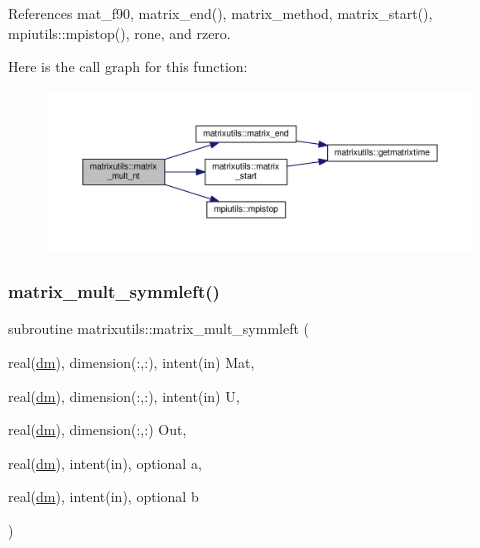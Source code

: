 References mat\+\_\+f90, matrix\+\_\+end(), matrix\+\_\+method, matrix\+\_\+start(), mpiutils\+::mpistop(), rone, and rzero.

Here is the call graph for this function\+:
\nopagebreak
\begin{figure}[H]
\begin{center}
\leavevmode
\includegraphics[width=350pt]{namespacematrixutils_a4a084a8c031469076ac26bf4e9055109_cgraph}
\end{center}
\end{figure}
\mbox{\label{namespacematrixutils_ab4f1087b56f3198b3d84c8ebf1cdd580}} 
\subsubsection{\texorpdfstring{matrix\+\_\+mult\+\_\+symmleft()}{matrix\_mult\_symmleft()}}
{\footnotesize\ttfamily subroutine matrixutils\+::matrix\+\_\+mult\+\_\+symmleft (\begin{DoxyParamCaption}\item[{real(\mbox{\hyperlink{namespacematrixutils_a7bdc564986ea4d90f51201c75606ef3d}{dm}}), dimension(\+:,\+:), intent(in)}]{Mat,  }\item[{real(\mbox{\hyperlink{namespacematrixutils_a7bdc564986ea4d90f51201c75606ef3d}{dm}}), dimension(\+:,\+:), intent(in)}]{U,  }\item[{real(\mbox{\hyperlink{namespacematrixutils_a7bdc564986ea4d90f51201c75606ef3d}{dm}}), dimension(\+:,\+:)}]{Out,  }\item[{real(\mbox{\hyperlink{namespacematrixutils_a7bdc564986ea4d90f51201c75606ef3d}{dm}}), intent(in), optional}]{a,  }\item[{real(\mbox{\hyperlink{namespacematrixutils_a7bdc564986ea4d90f51201c75606ef3d}{dm}}), intent(in), optional}]{b }\end{DoxyParamCaption})}




